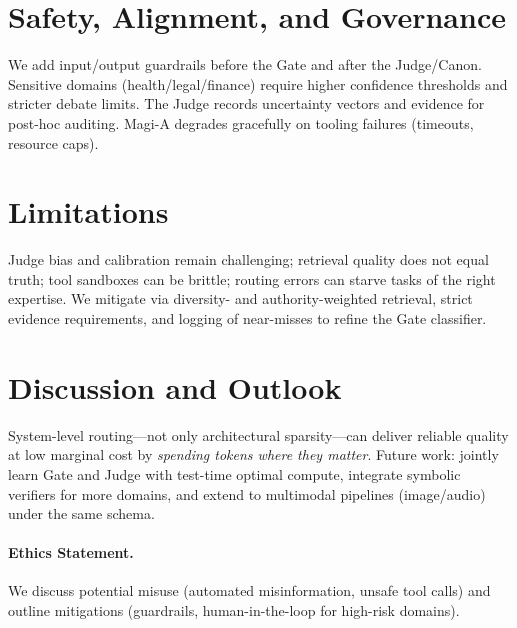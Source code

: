 \documentclass[11pt]{article}
\begin{document}
\section{Safety, Alignment, and Governance}
We add input/output guardrails before the Gate and after the Judge/Canon. Sensitive domains (health/legal/finance) require higher confidence thresholds and stricter debate limits. The Judge records uncertainty vectors and evidence for post-hoc auditing. Magi-A degrades gracefully on tooling failures (timeouts, resource caps).

\section{Limitations}
Judge bias and calibration remain challenging; retrieval quality does not equal truth; tool sandboxes can be brittle; routing errors can starve tasks of the right expertise. We mitigate via diversity- and authority-weighted retrieval, strict evidence requirements, and logging of near-misses to refine the Gate classifier.

\section{Discussion and Outlook}
System-level routing---not only architectural sparsity---can deliver reliable quality at low marginal cost by \emph{spending tokens where they matter}. Future work: jointly learn Gate and Judge with test-time optimal compute, integrate symbolic verifiers for more domains, and extend to multimodal pipelines (image/audio) under the same schema.

\paragraph{Ethics Statement.} We discuss potential misuse (automated misinformation, unsafe tool calls) and outline mitigations (guardrails, human-in-the-loop for high-risk domains).



\end{document}
